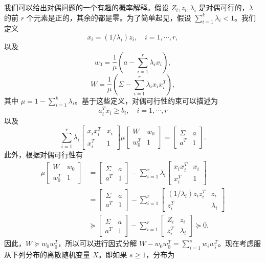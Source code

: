 \documentclass[UTF8, 12pt, fontset=fandol, oneside]{ctexart}
\begin{document}
我们可以给出对偶问题的一个有趣的概率解释。假设 $Z_i,z_i,\lambda_i$ 是对偶可行的，$\lambda$ 的前 $r$ 个元素是正的，其余的都是零。为了简单起见，假设 $\sum_{i=1}^k\lambda_i<1$。我们定义
\[
x_i=(1/\lambda_i)z_i,\quad i=1,\cdots,r,
\]
以及
\[
w_0=\frac{1}{\mu}\left(a-\sum_{i=1}^r\lambda_ix_i\right),
\]
\[
W=\frac{1}{\mu}\left(\Sigma-\sum_{i=1}^r\lambda_ix_ix_i^T\right),
\]
其中 $\mu=1-\sum_{i=1}^k\lambda_i$。基于这些定义，对偶可行性约束可以描述为
\[
a_i^Tx_i\geq b_i,\quad i=1,\cdots,r
\]
以及
\[
\sum_{i=1}^r\lambda_i
\begin{bmatrix}
x_ix_i^T & x_i\\
x_i^T & 1
\end{bmatrix}
\mu
\begin{bmatrix}
W & w_0\\
w_0^T & 1
\end{bmatrix}
=
\begin{bmatrix}
\Sigma & a\\
a^T & 1
\end{bmatrix}.
\]
此外，根据对偶可行性有
\[
\begin{aligned}
\mu
\begin{bmatrix}
W & w_0\\
w_0^T & 1
\end{bmatrix}
&=
\begin{bmatrix}
\Sigma & a\\
a^T & 1
\end{bmatrix}
-\sum_{i=1}^r\lambda_i
\begin{bmatrix}
x_ix_i^T & x_i\\
x_i^T & 1
\end{bmatrix}\\
&=
\begin{bmatrix}
\Sigma & a\\
a^T & 1
\end{bmatrix}
-\sum_{i=1}^r
\begin{bmatrix}
(1/\lambda_i)z_iz_i^T & z_i\\
z_i^T & \lambda_i
\end{bmatrix}\\
&\succeq
\begin{bmatrix}
\Sigma & a\\
a^T & 1
\end{bmatrix}
-\sum_{i=1}^r
\begin{bmatrix}
Z_i & z_i\\
z_i^T & \lambda_i
\end{bmatrix}
\succeq 0.
\end{aligned}
\]
因此，$W\succeq w_0w_0^T$，所以可以进行因式分解 $W-w_0w_0^T=\sum_{i=1}^s w_iw_i^T$。现在考虑服从下列分布的离散随机变量 $X$。即如果 $s\geq 1$，分布为
\end{document}
